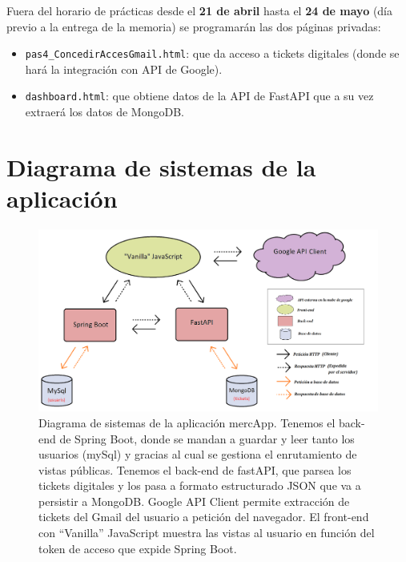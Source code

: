 \documentclass[a4paper,12pt]{report}
\begin{document}
		Fuera del horario de prácticas desde el \textbf{21 de abril} hasta el \textbf{24 de mayo} (día previo a la entrega de la memoria) se programarán las dos páginas privadas: 
		
		\begin{itemize}
			\item \texttt{pas4\_ConcedirAccesGmail.html}: que da acceso a tickets digitales (donde se hará la integración con API de Google).
			\item \texttt{dashboard.html}: que obtiene datos de la API de FastAPI que a su vez extraerá los datos de MongoDB.
		\end{itemize}

		
		
		
		

		

		
		\section{Diagrama de sistemas de la aplicación}
		
				
		\setlength{\belowcaptionskip}{3pt}
		\FloatBarrier
		\begin{figure}[H]
			\centering
			\includegraphics[width=1\textwidth]{img/diagramaSistemesAplicacioMercapp.png}
			\caption{Diagrama de sistemas de la aplicación mercApp. Tenemos el back-end de Spring Boot, donde se mandan a guardar y leer tanto los usuarios (mySql) y gracias al cual se gestiona el enrutamiento de vistas públicas. Tenemos el back-end de fastAPI, que parsea los tickets digitales y los pasa a formato estructurado JSON que va a persistir a MongoDB. Google API Client permite extracción de tickets del Gmail del usuario a petición del navegador. El front-end con ``Vanilla'' JavaScript muestra las vistas al usuario en función del token de acceso que expide Spring Boot.}

			
			\label{fig:diagramaSistemesAplicacioMercapp} 
		\end{figure}
		\FloatBarrier
				
\end{document}
